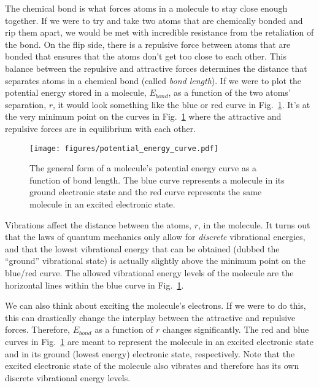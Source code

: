 \documentclass[12pt]{article}
\begin{document}
The chemical bond is what forces atoms in a molecule to stay close enough together. If we were to try and take two atoms that are chemically bonded and rip them apart, we would be met with incredible resistance from the retaliation of the bond. On the flip side, there is a repulsive force between atoms that are bonded that ensures that the atoms don't get too close to each other. This balance between the repulsive and attractive forces determines the distance that separates atoms in a chemical bond (called \textit{bond length}). If we were to plot the potential energy stored in a molecule, $E_{bond}$, as a function of the two atoms' separation, $r$, it would look something like the blue or red curve in Fig.~\ref{fig:potential_curve}. It's at the very minimum point on the curves in Fig.~\ref{fig:potential_curve} where the attractive and repulsive forces are in equilibrium with each other.

\begin{figure}
    \begin{center}
        \texttt{[image: figures/potential\_energy\_curve.pdf]}
    \end{center}
    \caption{
        The general form of a molecule's potential energy curve as a function of bond length. The blue curve represents a molecule in its ground electronic state and the red curve represents the same molecule in an excited electronic state.
    }
    \label{fig:potential_curve}
\end{figure}

Vibrations affect the distance between the atoms, $r$, in the molecule. It turns out that the laws of quantum mechanics only allow for \textit{discrete} vibrational energies, and that the lowest vibrational energy that can be obtained (dubbed the ``ground'' vibrational state) is actually slightly above the minimum point on the blue/red curve. The allowed vibrational energy levels of the molecule are the horizontal lines within the blue curve in Fig.~\ref{fig:potential_curve}.

We can also think about exciting the molecule's electrons. If we were to do this, this can drastically change the interplay between the attractive and repulsive forces. Therefore, $E_{bond}$ as a function of $r$ changes significantly. The red and blue curves in Fig.~\ref{fig:potential_curve} are meant to represent the molecule in an excited electronic state and in its ground (lowest energy) electronic state, respectively. Note that the excited electronic state of the molecule also vibrates and therefore has its own discrete vibrational energy levels.
\end{document}
